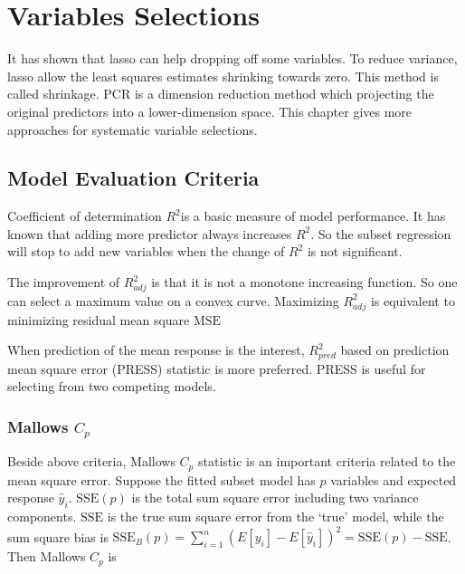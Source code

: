 \documentclass[
  11pt,
  openany]{memoir}
\begin{document}
\hypertarget{variables-selections}{%
\section{Variables Selections}\label{variables-selections}}

It has shown that lasso can help dropping off some variables.
To reduce variance, lasso allow the least squares estimates shrinking towards zero. This method is called shrinkage.
PCR is a dimension reduction method which projecting the original predictors into a lower-dimension space.
This chapter gives more approaches for systematic variable selections.

\hypertarget{model-evaluation-criteria}{%
\subsection{Model Evaluation Criteria}\label{model-evaluation-criteria}}

Coefficient of determination \(R^2\)is a basic measure of model performance. It has known that adding more predictor always increases \(R^2\). So the subset regression will stop to add new variables when the change of \(R^2\) is not significant.

The improvement of \(R^2_{adj}\) is that it is not a monotone increasing function. So one can select a maximum value on a convex curve.
Maximizing \(R^2_{adj}\) is equivalent to minimizing residual mean square \(\mathrm{MSE}\)

When prediction of the mean response is the interest, \(R^2_{pred}\) based on prediction mean square error (PRESS) statistic is more preferred. PRESS is useful for selecting from two competing models.

\hypertarget{mallows-c_p}{%
\subsubsection{\texorpdfstring{Mallows \(C_p\)}{Mallows C\_p}}\label{mallows-c_p}}

Beside above criteria, Mallows \(C_p\) statistic is an important criteria related to the mean square error.
Suppose the fitted subset model has \(p\) variables and expected response \(\hat y_i\). \(\mathrm{SSE}(p)\) is the total sum square error including two variance components.
\(\mathrm{SSE}\) is the true sum square error from the `true' model, while the sum square bias is \(\mathrm{SSE}_B(p)=\sum_{i=1}^n(E[y_i]-E[\hat y_i])^2= \mathrm{SSE}(p) - \mathrm{SSE}\).
Then Mallows \(C_p\) is
\end{document}
